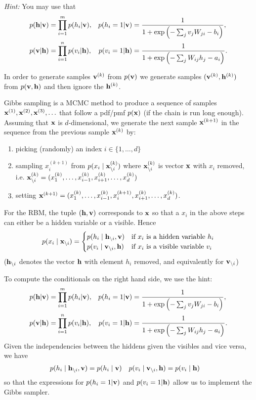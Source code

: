 \emph{Hint:} You may use that
\begin{align}
  p(\mathbf{h} | \mathbf{v}) &= \prod_{i=1}^m p(h_i | \mathbf{v}), &  p(h_i=1 | \mathbf{v}) & =  \frac{1}{ 1+  \exp\left(- \sum_j v_j W_{ji} - b_i \right)}, \\
  p(\mathbf{v} | \mathbf{h}) &= \prod_{i=1}^n p(v_i | \mathbf{h}), &  p(v_i = 1 | \mathbf{h}) &= \frac{1}{1+\exp\left(-\sum_j W_{ij} h_j-a_i\right)}.
\end{align}


\begin{solution}
In order to generate samples $\mathbf{v}^{(k)}$ from $p(\mathbf{v})$ we generate
samples $(\mathbf{v}^{(k)}, \mathbf{h}^{(k)})$ from $p(\mathbf{v}, \mathbf{h})$ and then ignore the
$\mathbf{h}^{(k)}$.

Gibbs sampling is a MCMC method to produce a sequence of samples
$\mathbf{x}^{(1)}, \mathbf{x}^{(2)}, \mathbf{x}^{(3)}, \ldots$ that follow a pdf/pmf $p(\mathbf{x})$
(if the chain is run long enough). Assuming that $\mathbf{x}$ is
$d$-dimensional, we generate the next sample $\mathbf{x}^{(k+1)}$ in the
sequence from the previous sample $\mathbf{x}^{(k)}$ by:
\begin{enumerate}
  \item picking (randomly) an index $i \in \{1, \ldots, d \}$
  \item sampling $x_i^{(k+1)}$ from $p(x_i \mid \mathbf{x}^{(k)}_{\backslash
    i})$ where $\mathbf{x}^{(k)}_{\backslash i}$ is vector $\mathbf{x}$ with $x_i$
    removed, i.e. $\mathbf{x}^{(k)}_{\backslash i}
    =({x}_1^{(k)},\ldots,{x}_{i-1}^{(k)},{x}_{i+1}^{(k)},\ldots,{x}_d^{(k)})$
  \item setting $\mathbf{x}^{(k+1)} =({x}_1^{(k)},\ldots,{x}_{i-1}^{(k)},x_i^{(k+1)},{x}_{i+1}^{(k)},\ldots,{x}_d^{(k)})$.
\end{enumerate}
For the RBM, the tuple $(\mathbf{h},\mathbf{v})$ corresponds to $\mathbf{x}$ so that a $x_i$
in the above steps can either be a hidden variable or a visible. Hence
\begin{equation}
  p(x_i \mid \mathbf{x}_{\backslash i}) = \begin{cases}
    p(h_i \mid \mathbf{h}_{\backslash i}, \mathbf{v}) & \text{if $x_i$ is a hidden variable $h_i$}\\
    p(v_i \mid \mathbf{v}_{\backslash i}, \mathbf{h}) & \text{if $x_i$ is a visible variable $v_i$}
  \end{cases}
\end{equation}
($\mathbf{h}_{\backslash i}$ denotes the vector $\mathbf{h}$ with element $h_i$
removed, and equivalently for $\mathbf{v}_{\backslash i}$)

To compute the conditionals on the right hand side, we use the hint:
\begin{align}
  p(\mathbf{h} | \mathbf{v}) &= \prod_{i=1}^m p(h_i | \mathbf{v}), &  p(h_i=1 | \mathbf{v}) & =  \frac{1}{ 1+  \exp\left(- \sum_j v_j W_{ji} - b_i \right)}, \\
  p(\mathbf{v} | \mathbf{h}) &= \prod_{i=1}^n p(v_i | \mathbf{h}), &  p(v_i = 1 | \mathbf{h}) &= \frac{1}{1+\exp\left(-\sum_j W_{ij} h_j-a_i\right)}.
\end{align}
Given the independencies between the hiddens given the visibles and vice versa, we have
\begin{align}
  p(h_i \mid \mathbf{h}_{\backslash i}, \mathbf{v}) & = p(h_i \mid \mathbf{v}) &   p(v_i \mid \mathbf{v}_{\backslash i}, \mathbf{h}) & = p(v_i \mid \mathbf{h})
\end{align}
so that the expressions for $p(h_i=1 | \mathbf{v})$ and $p(v_i = 1 | \mathbf{h})$ allow us to implement the Gibbs sampler.


\end{solution}
